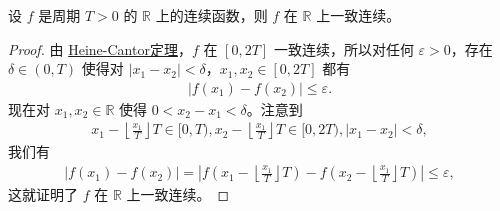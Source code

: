 \documentclass[../../main.tex]{subfiles}%
\begin{document}
\begin{proposition}[连续周期函数必一致连续]\label{proposition:连续周期函数必一致连续}
设 \(f\) 是周期 \(T > 0\) 的 \(\mathbb{R}\) 上的连续函数，则 \(f\) 在 \(\mathbb{R}\) 上一致连续。
\end{proposition}
\begin{proof}

由 \hyperref[theroem:Heine-Cantor定理]{Heine-Cantor定理}，\(f\) 在 \([0, 2T]\) 一致连续，所以对任何 \(\varepsilon > 0\)，存在 \(\delta \in (0, T)\) 使得对 \(|x_1 - x_2| < \delta\)，\(x_1, x_2 \in [0, 2T]\) 都有
\begin{align*}
|f(x_1) - f(x_2)| \leqslant \varepsilon.
\end{align*}
现在对 \(x_1, x_2 \in \mathbb{R}\) 使得 \(0 < x_2 - x_1 < \delta\)。注意到
\begin{align*}
x_1 - \left\lfloor \frac{x_1}{T} \right\rfloor T \in [0, T), x_2 - \left\lfloor \frac{x_1}{T} \right\rfloor T \in [0, 2T), |x_1 - x_2| < \delta,
\end{align*}
我们有
\begin{align*}
|f(x_1) - f(x_2)| = \left| f\left( x_1 - \left\lfloor \frac{x_1}{T} \right\rfloor T \right) - f\left( x_2 - \left\lfloor \frac{x_1}{T} \right\rfloor T \right) \right| \leqslant \varepsilon,
\end{align*}
这就证明了 \(f\) 在 \(\mathbb{R}\) 上一致连续。 

\end{proof}
\end{document}
